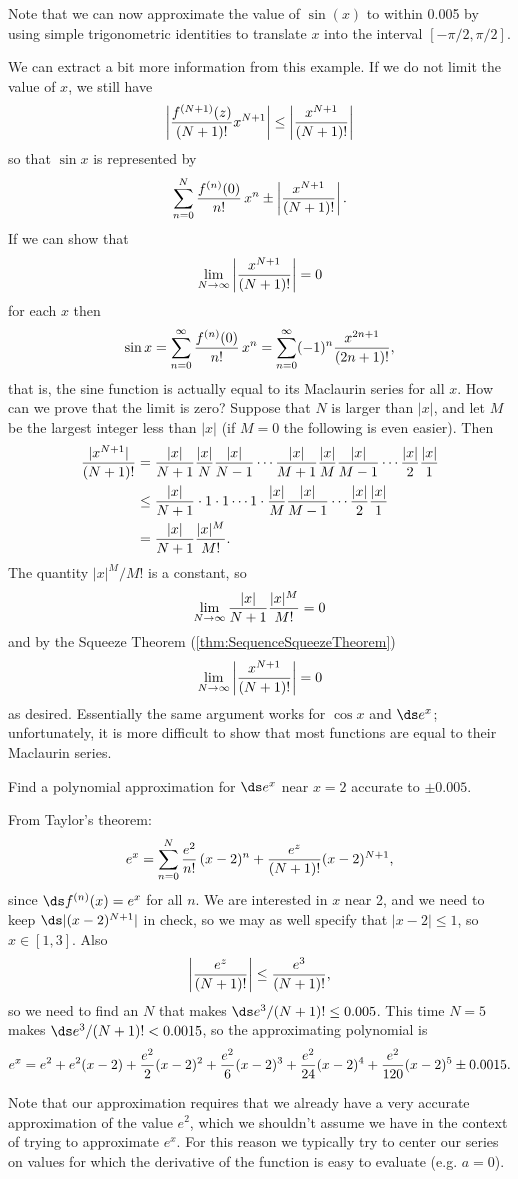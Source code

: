 Note that we can now approximate the value of $\sin(x)$ to within 0.005 by
using simple trigonometric identities to translate $x$ into the interval $[-\pi/2,\pi/2]$.

We can extract a bit more information from this example. If we do not
limit the value of $x$, we still have 
$$
  \left|{f^{(N+1)}(z)\over (N+1)!}x^{N+1}\right|\le 
  \left|{x^{N+1}\over (N+1)!}\right|
$$
so that $\sin x$ is represented by 
$$
  \sum_{n=0}^N{f^{(n)}(0)\over n!}\,x^n \pm 
  \left|{x^{N+1}\over (N+1)!}\right|.
$$
If we can show that 
$$
  \lim_{N\to\infty} \left|{x^{N+1}\over (N+1)!}\right|=0
$$
for each $x$ then 
$$
  \sin x=\sum_{n=0}^\infty{f^{(n)}(0)\over n!}\,x^n
  = \sum_{n=0}^\infty (-1)^n{x^{2n+1}\over (2n+1)!},
$$
that is, the sine function is actually equal to its
Maclaurin series for all $x$. How can we prove that the limit is zero?
Suppose that $N$ is larger than $|x|$, and let $M$ be the largest
integer less than $|x|$ (if $M=0$ the following is even easier). Then
\begin{align*}
  {|x^{N+1}|\over (N+1)!} &= {|x|\over N+1}{|x|\over N}{|x|\over N-1}\cdots{|x|\over M+1}{|x|\over M}{|x|\over M-1}\cdots {|x|\over 2}{|x|\over 1}	\\
  &\le {|x|\over N+1}\cdot 1\cdot 1\cdots 1\cdot{|x|\over M}{|x|\over M-1}\cdots {|x|\over 2}{|x|\over 1}	\\
  &={|x|\over N+1}{|x|^M\over M!}.
\end{align*}
The quantity $|x|^M/ M!$ is a constant, so 
$$
  \lim_{N\to\infty} {|x|\over N+1}{|x|^M\over M!} = 0
$$
and by the Squeeze Theorem (\ref{thm:SequenceSqueezeTheorem})
$$
  \lim_{N\to\infty} \left|{x^{N+1}\over (N+1)!}\right|=0
$$
as desired. Essentially the same argument works for $\cos x$ and $\ds
e^x$; unfortunately, it is more difficult to show that most functions
are equal to their Maclaurin series.

\begin{example}{}{}
Find a polynomial approximation for $\ds e^x$ near $x=2$
accurate to $\pm 0.005$. 
\end{example}
\begin{solution}
From Taylor's theorem:
$$
  e^x= \sum_{n=0}^N{e^2\over n!}\,(x-2)^n + 
  {e^z\over (N+1)!}(x-2)^{N+1},
$$
since $\ds f^{(n)}(x)=e^x$ for all $n$. We are interested in $x$ near 2,
and we need to keep $\ds |(x-2)^{N+1}|$ in check, so we may as well
specify that $|x-2|\le 1$, so $x\in[1,3]$. Also
$$\left|{e^z\over (N+1)!}\right|\le {e^3\over (N+1)!},$$
so we need to find an $N$ that makes $\ds e^3/(N+1)!\le 0.005$. This time
$N=5$ makes $\ds e^3/(N+1)!< 0.0015$, so the approximating polynomial is
$$
  e^x=e^2+e^2(x-2)+{e^2\over2}(x-2)^2+{e^2\over6}(x-2)^3+
  {e^2\over24}(x-2)^4+{e^2\over120}(x-2)^5
  \pm 0.0015.
$$

Note that our approximation requires that we already have a very
accurate approximation of the value $e^2$, which we shouldn't assume
we have in the context of trying to approximate $e^x$. For this reason
we typically try to center our series on values for which the derivative
of the function is easy to evaluate (e.g. $a=0$).
\end{solution}

